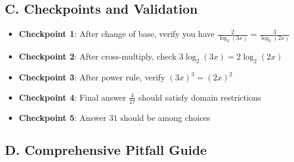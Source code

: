 \documentclass[12pt]{article}
\begin{document}
\subsection*{C. Checkpoints and Validation}

\begin{itemize}
    \item \textbf{Checkpoint 1}: After change of base, verify you have $\frac{2}{\log_2(3x)} = \frac{3}{\log_2(2x)}$
    \item \textbf{Checkpoint 2}: After cross-multiply, check $3\log_2(3x) = 2\log_2(2x)$
    \item \textbf{Checkpoint 3}: After power rule, verify $(3x)^3 = (2x)^2$
    \item \textbf{Checkpoint 4}: Final answer $\frac{4}{27}$ should satisfy domain restrictions
    \item \textbf{Checkpoint 5}: Answer $31$ should be among choices
\end{itemize}

\subsection*{D. Comprehensive Pitfall Guide}
\end{document}
